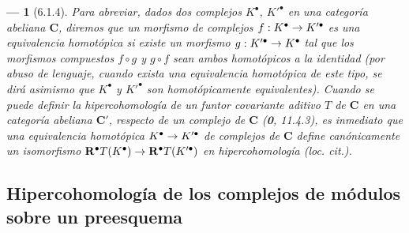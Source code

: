 \documentclass[10pt,oneside,openany]{book}
\theoremstyle{egaenv}\newtheorem*{env}{---}
\theoremstyle{egastatement}
\theoremstyle{egadescription}
\renewcommand{\to}{\mathchoice{\longrightarrow}{\rightarrow}{\rightarrow}{\rightarrow}}
\begin{document}
\begin{env}[6.1.4]
\label{III.6.1.4}
Para abreviar, dados dos complejos $K^\bullet$, $K'^\bullet$ en una categoría
abeliana $\boldsymbol{C}$, diremos que un morfismo de complejos
$f:K^\bullet\to K'^\bullet$ es una \emph{equivalencia homotópica} si existe un
morfismo $g:K'^\bullet\to K^\bullet$ tal que los morfismos compuestos
$f\circ g$ y $g\circ f$ sean ambos \emph{homotópicos a la identidad} (por abuso de
lenguaje, cuando exista una equivalencia homotópica de este tipo, se dirá
asimismo que $K^\bullet$ y $K'^\bullet$ son \emph{homotópicamente equivalentes}).
Cuando se puede definir la \emph{hipercohomología} de un funtor covariante aditivo
$T$ de $\boldsymbol{C}$ en una categoría abeliana $\boldsymbol{C}'$, respecto de un complejo de $\boldsymbol{C}$
(\textbf 0, 11.4.3), es inmediato que una equivalencia homotópica
$K^\bullet\to K'^\bullet$ de complejos de $\boldsymbol{C}$ define canónicamente un
\emph{isomorfismo}
$\mathbf R^\bullet T(K^\bullet)\to\mathbf R^\bullet T(K'^\bullet)$
en hipercohomología \emph{(loc. cit.)}.
\end{env}

\subsection{Hipercohomología de los complejos de módulos sobre un preesquema}
\label{subsection:III.6.2}
\label{subsection:III.6.2.fr}
\end{document}
